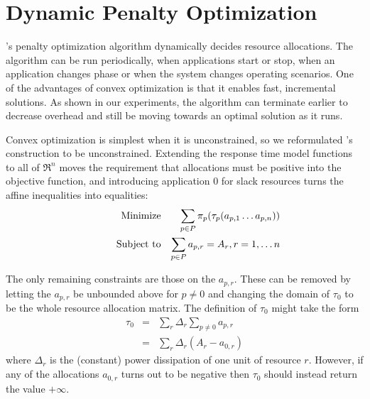 \section{Dynamic Penalty Optimization}\label{dyn_opt}


\pacora's penalty optimization algorithm dynamically decides resource allocations. The algorithm can be run periodically, when applications start or stop, when an application changes phase or when the system changes operating scenarios.  One of the advantages of convex optimization is that it enables fast, incremental solutions.  As shown in our experiments, the algorithm can terminate earlier to decrease overhead and still be moving towards an optimal solution as it runs.  %

Convex optimization is simplest when it is unconstrained, so we reformulated \pacora's construction to be unconstrained.
Extending the response time model functions to all of $\Re^n$
moves the requirement that allocations must be positive into the objective function,
and introducing application 0 for slack resources turns the affine inequalities into equalities:
\begin{eqnarray*}
& \makebox[1in][r]{Minimize}   & \sum_{p\in P} {\pi_p(\tau_p(a_{p,1}\ldots a_{p,n}))}  \\
& \makebox[1in][r]{Subject to} & \sum_{p\in P} a_{p,r} = A_r, r = 1,\ldots n           \\
\end{eqnarray*}

The only remaining constraints are those on the $a_{p,r}$.
These can be removed by letting the $a_{p,r}$ be unbounded above for $p \neq 0$
and changing the domain of $\tau_0$  to be the whole resource allocation matrix.
The definition of $\tau_0$ might take the form
\begin{eqnarray*}
\tau_0 &=& \sum_r \Delta_r \sum_{p \neq 0} a_{p,r}     \\
       &=& \sum_r \Delta_r (A_r - a_{0,r})
\end{eqnarray*}
where $\Delta_r$ is the (constant) power dissipation of one unit of resource $r$.
However, if any of the allocations $a_{0,r}$ turns out to be negative then $\tau_0$  should instead return the value $+\infty$.

